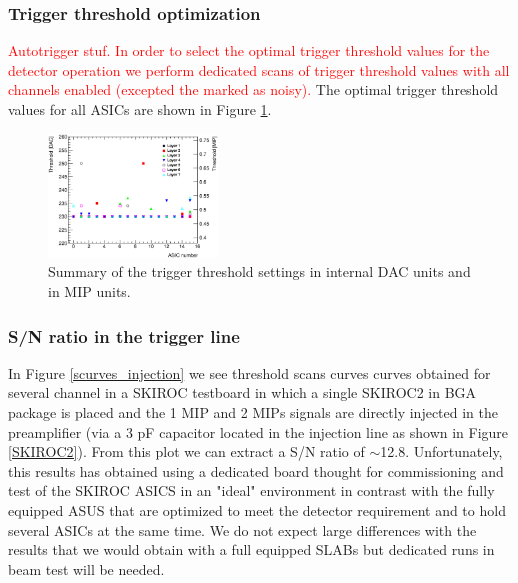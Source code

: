 \documentclass[final,3p,times,twocolumn]{elsarticle}
\newcommand{\todo}[1]{\textcolor{red}{{#1}}}
\begin{document}
\subsubsection{Trigger threshold optimization}
\label{sec:comm_trigger}

\todo{Autotrigger stuf.
In order to select the optimal trigger threshold values for the detector operation
we perform dedicated scans of trigger threshold values
with all channels enabled (excepted the marked as noisy). }
The optimal trigger threshold values for all ASICs are shown in Figure \ref{trigger_thresholds}.

\begin{figure}[!t]
  \centering
  \includegraphics[width=0.4\textwidth]{../figs/commissioning/threshold_chip.eps}
  \caption{Summary of the trigger threshold settings in internal DAC units and in MIP units.}
\label{trigger_thresholds}
\end{figure}

\subsubsection{S/N ratio in the trigger line}
\label{sec:comm_trigger_sn}

In Figure \ref{scurves_injection} we see threshold scans curves
 curves obtained for several channel
in a SKIROC testboard in which a single SKIROC2 in BGA package is placed and the 1 MIP and 2 MIPs 
 signals are directly injected in the preamplifier 
(via a 3 pF capacitor located in the injection line as shown in Figure \ref{SKIROC2}). 
From this plot we can extract a S/N ratio of $\sim$12.8. 
Unfortunately, this results has obtained using
a dedicated board thought for commissioning and test of the SKIROC ASICS in an
"ideal" environment in contrast with the fully equipped
ASUS that are optimized to meet the detector requirement and to hold several ASICs at the same time.
We do not expect large differences with the results that we would obtain with 
a full equipped SLABs but dedicated runs in beam test will be needed.
\end{document}
